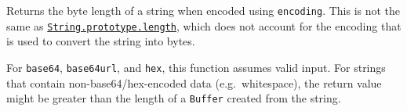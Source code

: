 Returns the byte length of a string when encoded using
\texttt{encoding}. This is not the same as
\href{https://developer.mozilla.org/en-US/docs/Web/JavaScript/Reference/Global_Objects/String/length}{\texttt{String.prototype.length}},
which does not account for the encoding that is used to convert the
string into bytes.

For \texttt{\textquotesingle{}base64\textquotesingle{}},
\texttt{\textquotesingle{}base64url\textquotesingle{}}, and
\texttt{\textquotesingle{}hex\textquotesingle{}}, this function assumes
valid input. For strings that contain non-base64/hex-encoded data
(e.g.~whitespace), the return value might be greater than the length of
a \texttt{Buffer} created from the string.

\begin{Shaded}
\begin{Highlighting}[]
\NormalTok{ \{ }\NormalTok{ \} } \OperatorTok{;}

\OperatorTok{=} \StringTok{\textquotesingle{}}\StringTok{ + }\StringTok{ = }\StringTok{\textquotesingle{}}\OperatorTok{;}

\NormalTok{(}\VerbatimStringTok{\textasciigrave{}}\SpecialCharTok{$\{}\SpecialCharTok{\}}\VerbatimStringTok{: }\SpecialCharTok{$\{}\SpecialCharTok{\}} \OperatorTok{+}
            \VerbatimStringTok{\textasciigrave{}}\SpecialCharTok{$\{}\OperatorTok{,} \NormalTok{)}\SpecialCharTok{\}}\NormalTok{)}\OperatorTok{;}
\end{Highlighting}
\end{Shaded}

